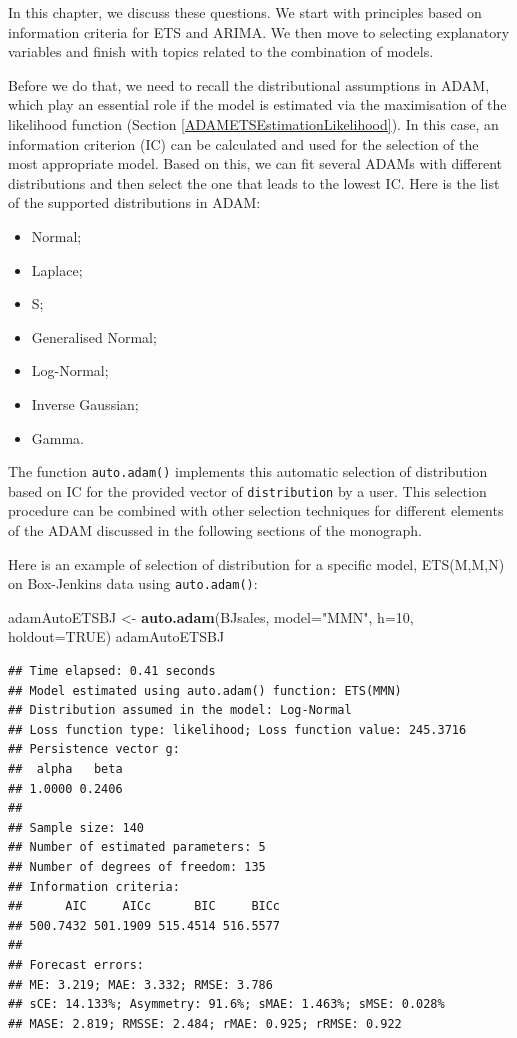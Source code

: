 \documentclass[]{book}
\newenvironment{Shaded}{\begin{snugshade}}{\end{snugshade}}
\newcommand{\DataTypeTok}[1]{\textcolor[rgb]{0.13,0.29,0.53}{#1}}
\newcommand{\DecValTok}[1]{\textcolor[rgb]{0.00,0.00,0.81}{#1}}
\newcommand{\KeywordTok}[1]{\textcolor[rgb]{0.13,0.29,0.53}{\textbf{#1}}}
\newcommand{\NormalTok}[1]{#1}
\newcommand{\OtherTok}[1]{\textcolor[rgb]{0.56,0.35,0.01}{#1}}
\newcommand{\StringTok}[1]{\textcolor[rgb]{0.31,0.60,0.02}{#1}}
\providecommand{\tightlist}{%
  \setlength{\itemsep}{0pt}\setlength{\parskip}{0pt}}
\theoremstyle{definition}
\theoremstyle{definition}
\theoremstyle{definition}
\theoremstyle{definition}
\theoremstyle{remark}
\begin{document}
In this chapter, we discuss these questions. We start with principles based on information criteria \citep[addressed in Chapter 13 of][]{SvetunkovSBA} for ETS and ARIMA. We then move to selecting explanatory variables and finish with topics related to the combination of models.

Before we do that, we need to recall the distributional assumptions in ADAM, which play an essential role if the model is estimated via the maximisation of the likelihood function (Section \ref{ADAMETSEstimationLikelihood}). In this case, an information criterion (IC) can be calculated and used for the selection of the most appropriate model. Based on this, we can fit several ADAMs with different distributions and then select the one that leads to the lowest IC. Here is the list of the supported distributions in ADAM:

\begin{itemize}
\tightlist
\item
  Normal;
\item
  Laplace;
\item
  S;
\item
  Generalised Normal;
\item
  Log-Normal;
\item
  Inverse Gaussian;
\item
  Gamma.
\end{itemize}

The function \texttt{auto.adam()} implements this automatic selection of distribution based on IC for the provided vector of \texttt{distribution} by a user. This selection procedure can be combined with other selection techniques for different elements of the ADAM discussed in the following sections of the monograph.

Here is an example of selection of distribution for a specific model, ETS(M,M,N) on Box-Jenkins data using \texttt{auto.adam()}:

\begin{Shaded}
\begin{Highlighting}[]
\NormalTok{adamAutoETSBJ <-}\StringTok{ }\KeywordTok{auto.adam}\NormalTok{(BJsales, }\DataTypeTok{model=}\StringTok{"MMN"}\NormalTok{, }\DataTypeTok{h=}\DecValTok{10}\NormalTok{, }\DataTypeTok{holdout=}\OtherTok{TRUE}\NormalTok{)}
\NormalTok{adamAutoETSBJ}
\end{Highlighting}
\end{Shaded}

\begin{verbatim}
## Time elapsed: 0.41 seconds
## Model estimated using auto.adam() function: ETS(MMN)
## Distribution assumed in the model: Log-Normal
## Loss function type: likelihood; Loss function value: 245.3716
## Persistence vector g:
##  alpha   beta 
## 1.0000 0.2406 
## 
## Sample size: 140
## Number of estimated parameters: 5
## Number of degrees of freedom: 135
## Information criteria:
##      AIC     AICc      BIC     BICc 
## 500.7432 501.1909 515.4514 516.5577 
## 
## Forecast errors:
## ME: 3.219; MAE: 3.332; RMSE: 3.786
## sCE: 14.133%; Asymmetry: 91.6%; sMAE: 1.463%; sMSE: 0.028%
## MASE: 2.819; RMSSE: 2.484; rMAE: 0.925; rRMSE: 0.922
\end{verbatim}
\end{document}
